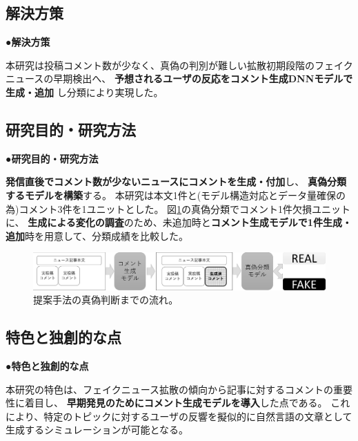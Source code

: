 {	\subsection{解決方策}
	\noindent
	●\textbf{解決方策}

	本研究は投稿コメント数が少なく、真偽の判別が難しい拡散初期段階のフェイクニュースの早期検出へ、
	\textbf{予想されるユーザの反応をコメント生成DNNモデルで生成・追加}
	し分類により実現した。

	\subsection{研究目的・研究方法}
	\noindent
	●\textbf{研究目的・研究方法}

	\textbf{発信直後でコメント数が少ないニュースにコメントを⽣成・付加}し、
	\textbf{真偽分類するモデルを構築}する。
	本研究は本文1件と(モデル構造対応とデータ量確保の為)コメント3件を1ユニットとした。
	図\ref{fig:model}の真偽分類でコメント1件欠損ユニットに、
	\textbf{生成による変化の調査}のため、未追加時と\textbf{コメント生成モデルで1件生成・追加}時を用意して、分類成績を比較した。
	
	\begin{figure}[ht]
		\centering
		\includegraphics[width=0.95\linewidth]{figs/model.pdf}
		\vspace*{-3mm}
		\caption{提案手法の真偽判断までの流れ。}
		\label{fig:model}
	\end{figure}
	\vspace*{-4mm}
	\subsection{特色と独創的な点}
	\noindent
	●\textbf{特色と独創的な点}

	本研究の特⾊は、フェイクニュース拡散の傾向から記事に対するコメントの重要性に着目し、
	\textbf{早期発⾒のためにコメント⽣成モデルを導⼊}した点である。
	これにより、特定のトピックに対するユーザの反響を擬似的に自然言語の文章として生成するシミュレーションが可能となる。

}
